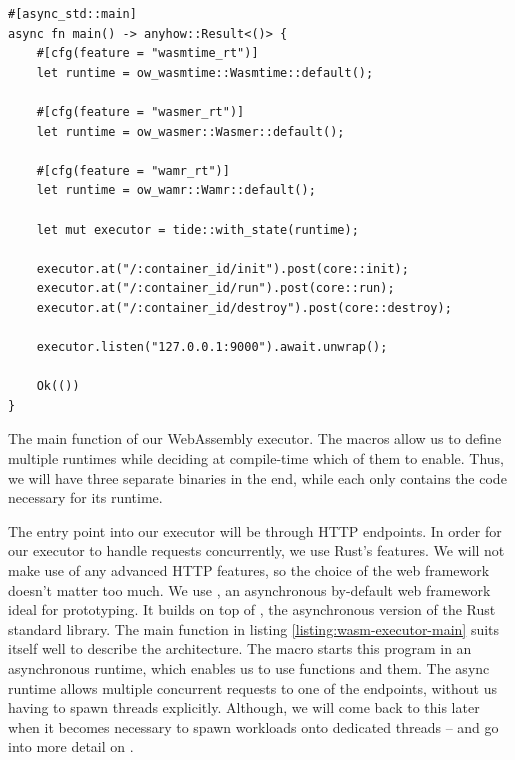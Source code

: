 \begin{listing}[ht]
    \begin{verbatim}
#[async_std::main]
async fn main() -> anyhow::Result<()> {
    #[cfg(feature = "wasmtime_rt")]
    let runtime = ow_wasmtime::Wasmtime::default();

    #[cfg(feature = "wasmer_rt")]
    let runtime = ow_wasmer::Wasmer::default();

    #[cfg(feature = "wamr_rt")]
    let runtime = ow_wamr::Wamr::default();

    let mut executor = tide::with_state(runtime);

    executor.at("/:container_id/init").post(core::init);
    executor.at("/:container_id/run").post(core::run);
    executor.at("/:container_id/destroy").post(core::destroy);

    executor.listen("127.0.0.1:9000").await.unwrap();

    Ok(())
}
\end{verbatim}
    \caption{The main function of our WebAssembly executor. The \inl{\#[cfg(feature = "...")]} macros allow us to define multiple runtimes while deciding at compile-time which of them to enable. Thus, we will have three separate binaries in the end, while each only contains the code necessary for its runtime.}
    \label{listing:wasm-executor-main}
\end{listing}

The entry point into our executor will be through HTTP endpoints. In order for our executor to handle requests concurrently, we use Rust's  features. We will not make use of any advanced HTTP features, so the choice of the web framework doesn't matter too much. We use  \cite{Turon2021}, an asynchronous by-default web framework ideal for prototyping. It builds on top of , the asynchronous version of the Rust standard library. The main function in listing \ref{listing:wasm-executor-main} suits itself well to describe the architecture. The  macro starts this program in an asynchronous runtime, which enables us to use  functions and  them. The async runtime allows multiple concurrent requests to one of the endpoints, without us having to spawn threads explicitly. Although, we will come back to this later when it becomes necessary to spawn workloads onto dedicated threads -- and go into more detail on .

